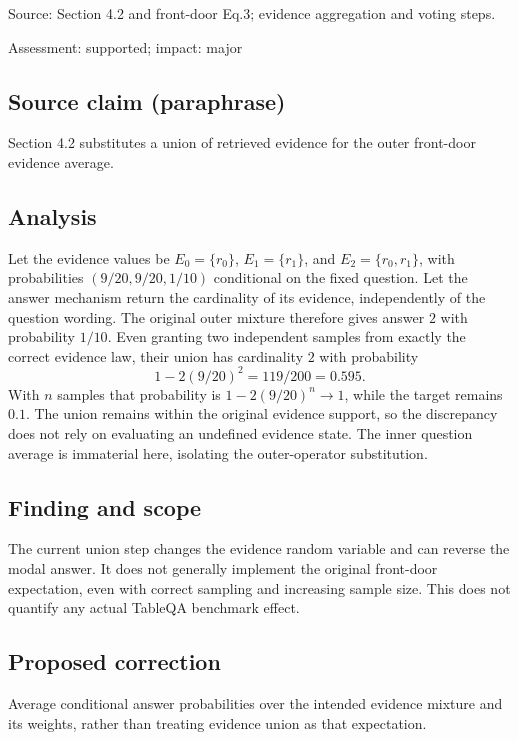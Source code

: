 \documentclass[11pt]{article}
\begin{document}
Source: Section 4.2 and front-door Eq.3; evidence aggregation and voting steps.

Assessment: supported; impact: major

\subsection*{Source claim (paraphrase)}

Section 4.2 substitutes a union of retrieved evidence for the outer front-door evidence average.

\subsection*{Analysis}

Let the evidence values be \(E_0=\{r_0\}\), \(E_1=\{r_1\}\), and \(E_2=\{r_0,r_1\}\), with probabilities \((9/20,9/20,1/10)\) conditional on the fixed question. Let the answer mechanism return the cardinality of its evidence, independently of the question wording. The original outer mixture therefore gives answer \(2\) with probability \(1/10\). Even granting two independent samples from exactly the correct evidence law, their union has cardinality \(2\) with probability \[1-2(9/20)^2=119/200=0.595.\] With \(n\) samples that probability is \(1-2(9/20)^n\to1\), while the target remains \(0.1\). The union remains within the original evidence support, so the discrepancy does not rely on evaluating an undefined evidence state. The inner question average is immaterial here, isolating the outer-operator substitution.

\subsection*{Finding and scope}

The current union step changes the evidence random variable and can reverse the modal answer. It does not generally implement the original front-door expectation, even with correct sampling and increasing sample size. This does not quantify any actual TableQA benchmark effect.

\subsection*{Proposed correction}

Average conditional answer probabilities over the intended evidence mixture and its weights, rather than treating evidence union as that expectation.
\end{document}
